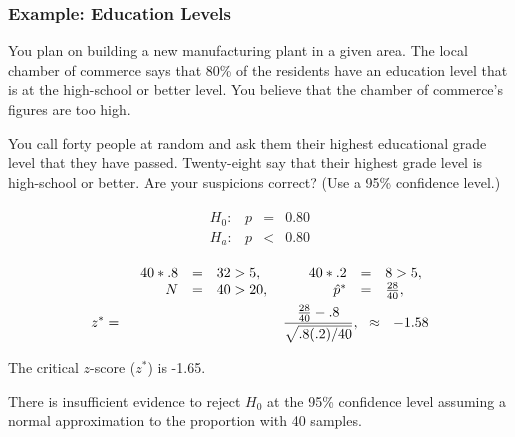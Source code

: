 \begin{frame}
  \frametitle{Example: Education Levels}

  \vspace*{-2em}
  You plan on building a new manufacturing plant in a given area. The
  local chamber of commerce says that 80\% of the residents have an
  education level that is at the high-school or better level. You
  believe that the chamber of commerce's figures are too high.

  You call forty people at random and ask them their highest
  educational grade level that they have passed. Twenty-eight say that
  their highest grade level is high-school or better. Are your
  suspicions correct? (Use a 95\% confidence level.)

  \vfill

  {
    \begin{eqnarray*}
      \begin{array}{lrcl}
        H_0: & p & = & 0.80 \\
        H_a: & p & < & 0.80
      \end{array}
    \end{eqnarray*}
  }

  {
    \begin{eqnarray*}
      & & 
      \begin{array}{rcl@{\hspace{3em}}rcl}
          40*.8 & = & 32>5, & 40*.2 & = & 8>5, \\
          N & = & 40>20, & \hat{p}^* & = & \frac{28}{40},
        \end{array} \\
      z^* & = & \frac{\frac{28}{40}-.8}{\sqrt{.8(.2)/40}}, ~~ \approx ~~ -1.58
    \end{eqnarray*}
  }
  

  {
    The critical $z$-score ($z^*$) is -1.65.
  }

  {

    {\color{red}
      There is insufficient evidence to reject $H_0$ at the 95\%
      confidence level assuming a normal approximation to the
      proportion with 40 samples.
    }

  }

  \vfill
  
\end{frame}


